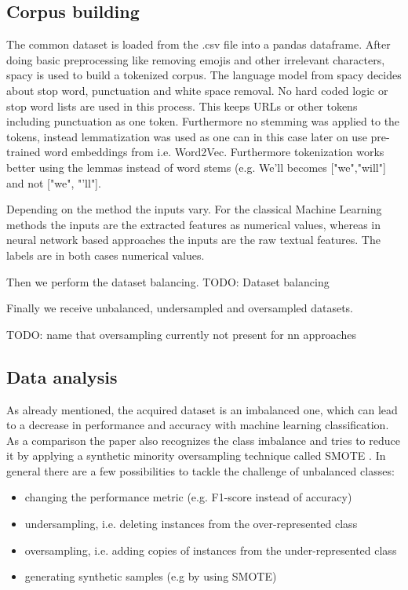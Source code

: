 \subsection{Corpus building}

The common dataset is loaded from the .csv file into a pandas dataframe. After doing basic preprocessing like removing emojis and other irrelevant characters, spacy is used to build a tokenized corpus. The language model from spacy decides about stop word, punctuation and white space removal. No hard coded logic or stop word lists are used in this process. This keeps URLs or other tokens including punctuation as one token. Furthermore no stemming was applied to the tokens, instead lemmatization was used as one can in this case later on use pre-trained word embeddings from i.e. Word2Vec. Furthermore tokenization works better using the lemmas instead of word stems (e.g. We'll becomes ["we","will"] and not ["we", "'ll"].



Depending on the method the inputs vary. For the classical Machine Learning methods the inputs are the extracted features as numerical values, whereas in neural network based approaches the inputs are the raw textual features. The labels are in both cases numerical values.

Then we perform the dataset balancing.
TODO: Dataset balancing


Finally we receive unbalanced, undersampled and oversampled datasets.

TODO: name that oversampling currently not present for nn approaches

\subsection{Data analysis} \label{sec:data_analysis}


As already mentioned, the acquired dataset is an imbalanced one, which can lead to a decrease in performance and accuracy with machine learning classification. As a comparison the paper \cite{Oriola2020} also recognizes the class imbalance and tries to reduce it by applying a synthetic minority oversampling technique called SMOTE \cite{Chawla2011}. In general there are a few possibilities to tackle the challenge of unbalanced classes:

\begin{itemize}
    \item changing the performance metric (e.g. F1-score instead of accuracy)
    \item undersampling, i.e. deleting instances from the over-represented class
    \item oversampling, i.e. adding copies of instances from the under-represented class
    \item generating synthetic samples (e.g by using SMOTE)
\end{itemize}

